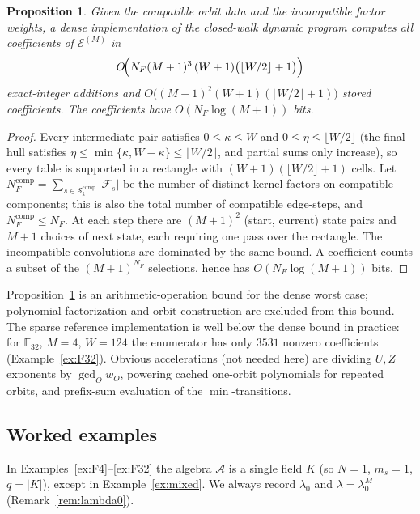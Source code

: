 \documentclass[preprint,12pt,a4paper]{elsarticle}
\newcommand{\F}{\mathbb F}
\newcommand{\A}{\mathcal A}
\newcommand{\Fs}{\mathcal F_s}
\newcommand{\Epoly}{\mathscr E}
\newtheorem{proposition}[theorem]{Proposition}
\theoremstyle{definition}
\theoremstyle{remark}
\begin{document}
\begin{proposition}\label{prop:complexity}
Given the compatible orbit data and the incompatible factor weights, a dense implementation of the closed-walk dynamic
program computes all coefficients of $\Epoly^{(M)}$ in
\[
O\!\Bigl(N_F(M+1)^3\,(W+1)\bigl(\lfloor W/2\rfloor+1\bigr)\Bigr)
\]
exact-integer additions and
$O\!\bigl((M+1)^2(W+1)(\lfloor W/2\rfloor+1)\bigr)$ stored coefficients.
The coefficients have $O(N_F\log(M+1))$ bits.
\end{proposition}

\begin{proof}
Every intermediate pair satisfies $0\leq\kappa\leq W$ and
$0\leq\eta\leq\lfloor W/2\rfloor$ (the final hull satisfies
$\eta\leq\min\{\kappa,W-\kappa\}\leq\lfloor W/2\rfloor$, and partial sums only
increase),
so every table is supported in a rectangle with
$(W+1)(\lfloor W/2\rfloor+1)$ cells.  Let
$N_F^{\mathrm{comp}}=\sum_{s\in\mathcal{S}_k^{\mathrm{comp}}}|\Fs|$ be the
number of distinct kernel factors on compatible components; this is also the
total number of compatible edge-steps, and $N_F^{\mathrm{comp}}\leq N_F$.
At each step there are $(M+1)^2$
(start, current) state pairs and $M+1$ choices of next state, each requiring
one pass over the rectangle.  The incompatible convolutions are dominated by
the same bound.  A coefficient counts a subset of the $(M+1)^{N_F}$
selections, hence has $O(N_F\log(M+1))$ bits.
\end{proof}

Proposition~\ref{prop:complexity} is an arithmetic-operation bound for the
dense worst case; polynomial factorization and orbit construction are
excluded from this bound.  The sparse reference
implementation is well below the dense bound in practice: for
$\F_{32}$, $M=4$, $W=124$ the enumerator has only $3531$ nonzero coefficients
(Example~\ref{ex:F32}).  Obvious accelerations (not needed here) are dividing
$U,Z$ exponents by $\gcd_O w_O$, powering cached one-orbit polynomials for
repeated orbits, and prefix-sum evaluation of the $\min$-transitions.

\subsection{Worked examples}\label{sec:worked}

In Examples~\ref{ex:F4}--\ref{ex:F32} the algebra $\A$ is a single field $K$
(so $N=1$, $m_s=1$, $q=|K|$), except in Example~\ref{ex:mixed}.  We always
record $\lambda_0$ and $\lambda=\lambda_0^M$
(Remark~\ref{rem:lambda0}).
\end{document}
